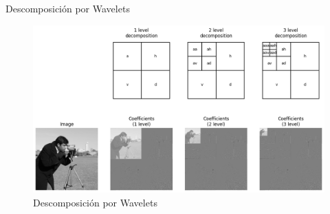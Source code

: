 \begin{frame}{Descomposición por Wavelets}
    \begin{figure}
        \centering
        \includegraphics[scale=0.4]{img/section_07/Wavelets_decomposition.png}
        \caption{Descomposición por Wavelets}
        \label{fig:descomposicion}
    \end{figure}
\end{frame}

